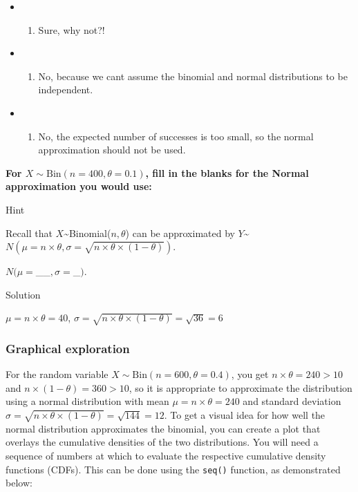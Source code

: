 \documentclass[
]{book}
\providecommand{\tightlist}{%
  \setlength{\itemsep}{0pt}\setlength{\parskip}{0pt}}
\begin{document}
\begin{itemize}
\item
  \begin{enumerate}
  \def\labelenumi{(\Alph{enumi})}
  \tightlist
  \item
    Sure, why not?!\\
  \end{enumerate}
\item
  \begin{enumerate}
  \def\labelenumi{(\Alph{enumi})}
  \setcounter{enumi}{1}
  \tightlist
  \item
    No, because we can\textquotesingle t assume the binomial and normal distributions to be independent.\\
  \end{enumerate}
\item
  \begin{enumerate}
  \def\labelenumi{(\Alph{enumi})}
  \setcounter{enumi}{2}
  \tightlist
  \item
    No, the expected number of successes is too small, so the normal approximation should not be used.
  \end{enumerate}
\end{itemize}

\textbf{For \(X \sim \mbox{Bin}(n=400,\theta=0.1)\), fill in the blanks for the Normal approximation you would use:}

Hint

Recall that \(X\)\textasciitilde Binomial(\(n,\theta\)) can be approximated by \(Y\)\textasciitilde{}\(N\left(\mu=n \times \theta,\sigma=\sqrt{n \times \theta \times (1-\theta)}\right)\).

\(N(\mu=\)\_\_\(,\sigma=\)\_\()\).

Solution

\(\mu=n \times \theta=40\), \(\sigma=\sqrt{n \times \theta \times (1-\theta)}=\sqrt{36}=6\)

\hypertarget{graphical-exploration}{%
\subsubsection{Graphical exploration}\label{graphical-exploration}}

For the random variable \(X \sim \mbox{Bin}(n=600,\theta=0.4)\), you get \(n \times \theta=240>10\) and \(n \times (1-\theta)=360>10\), so it is appropriate to approximate the distribution using a normal distribution with mean \(\mu=n \times \theta=240\) and standard deviation \(\sigma=\sqrt{n \times \theta \times (1-\theta)}=\sqrt{144}=12\). To get a visual idea for how well the normal distribution approximates the binomial, you can create a plot that overlays the cumulative densities of the two distributions. You will need a sequence of numbers at which to evaluate the respective cumulative density functions (CDFs). This can be done using the \texttt{seq()} function, as demonstrated below:
\end{document}
